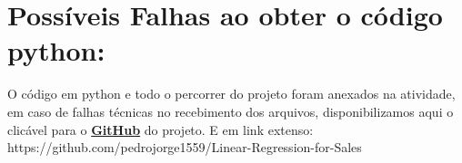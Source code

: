 \documentclass[a4paper,12pt]{article}
\begin{document}
\section{Possíveis Falhas ao obter o código python:}
O código em python e todo o percorrer do projeto foram anexados na atividade, em caso de falhas técnicas no recebimento dos arquivos, disponibilizamos aqui o clicável para o \href{https://github.com/pedrojorge1559/Linear-Regression-for-Sales}{\textbf{GitHub}} do projeto.
\newline E em link extenso: https://github.com/pedrojorge1559/Linear-Regression-for-Sales
\end{document}
